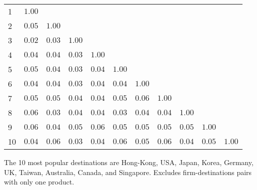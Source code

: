\documentclass{article}
\begin{document}
\begin{table}[h]
{\begin{threeparttable}
\begin{tabular}{lrrrrrrrrrr}
\cmidrule{2-11} 
1  & $1.00$    &              &             &             &              &            &               &            &              &                        \\  
2  & $0.05$    & $1.00$     &             &             &              &            &               &            &              &                        \\  
3  & $0.02$    & $0.03$     & $1.00$    &             &              &            &               &            &              &                        \\  
4  & $0.04$    & $0.04$     & $0.03$    &  $1.00$   &              &            &               &            &              &                        \\  
5  & $0.05$    & $0.04$     & $0.03$    &  $0.04$   & $1.00$     &            &               &            &              &                        \\  
6  & $0.04$    & $0.04$     & $0.03$    &  $0.04$   & $0.04$     &  $1.00$  &               &            &              &                        \\  
7  & $0.05$    & $0.05$     & $0.04$    &  $0.04$   & $0.05$     &  $0.06$  &  $1.00$     &            &              &                        \\  
8  & $0.06$    & $0.03$     & $0.04$    &  $0.04$   & $0.03$     &  $0.04$  &  $0.04$     & $1.00$   &              &                        \\  
9  & $0.06$    & $0.04$     & $0.05$    &  $0.06$   & $0.05$     &  $0.05$  &  $0.05$     & $0.05$   & $1.00$     &                        \\  
10 & $0.04$   & $0.06$    & $0.03$   &  $0.04$  & $0.06$    &  $0.05$ &  $0.06$    & $0.04$  & $0.05$    &   $1.00$           \\  
\hline
\hline
\end{tabular}
\begin{tablenotes}
\small
\item  \noindent  \footnotesize{The 10 most popular destinations are Hong-Kong, USA, Japan, Korea, Germany, UK, Taiwan, Australia, Canada, and Singapore. Excludes firm-destinations pairs with only one product.}
\end{tablenotes}
\end{threeparttable}
}
\end{table}
\end{document}

